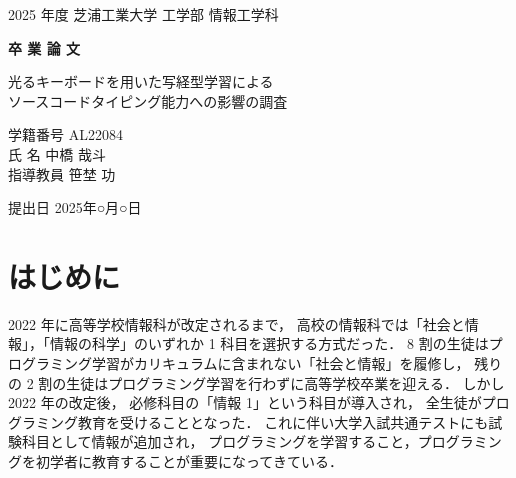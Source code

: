 \documentclass[uplatex, a4paper, 12pt]{jsarticle}
\begin{document}
\thispagestyle{empty} %

\begin{center}
\vspace*{2cm}

{\LARGE 2025 年度 芝浦工業大学 工学部 情報工学科}

\vspace{1.5cm}

{\Huge \textbf{卒 業 論 文}}

\vspace{2.5cm}

{\Large 光るキーボードを用いた写経型学習による\\[0.8em]
ソースコードタイピング能力への影響の調査}

\vspace{3cm}

{\Large
学籍番号  AL22084\\[1em]
氏    名  中橋 哉斗\\[1em]
指導教員  笹埜 功
}

\vfill

{\Large 提出日  2025年○月○日}

\end{center}

\clearpage

\section{はじめに}

2022 年に高等学校情報科が改定されるまで，
高校の情報科では「社会と情報」，「情報の科学」のいずれか 1 科目を選択する方式だった．
8 割の生徒はプログラミング学習がカリキュラムに含まれない「社会と情報」を履修し，
残りの 2 割の生徒はプログラミング学習を行わずに高等学校卒業を迎える．
しかし 2022 年の改定後，
必修科目の「情報 1」という科目が導入され，
全生徒がプログラミング教育を受けることとなった．
これに伴い大学入試共通テストにも試験科目として情報が追加され，
プログラミングを学習すること，プログラミングを初学者に教育することが重要になってきている．
\end{document}
